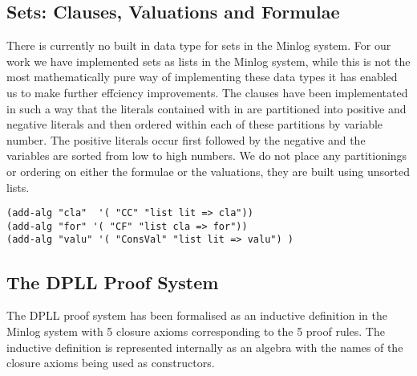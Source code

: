 \subsection*{Sets: Clauses, Valuations and Formulae}
There is currently no built in data type for sets in the Minlog system. For our work we have implemented sets as lists in the Minlog system, while this is not the most mathematically pure way of implementing these data types it has enabled us to make further effciency improvements. The clauses have been implementated in such a way that the literals contained with in are partitioned into positive and negative literals and then ordered within each of these partitions by variable number. The positive literals occur first followed by the negative and the variables are sorted from low to high numbers. We do not place any partitionings or ordering on either the formulae or the valuations, they are built using unsorted lists.

\begin{lstlisting}[caption = "Definitions of clauses \, formulae and valulations in the Minlog system"]
(add-alg "cla"  '( "CC" "list lit => cla"))
(add-alg "for" '( "CF" "list cla => for"))
(add-alg "valu" '( "ConsVal" "list lit => valu") )
\end{lstlisting}


\subsection*{The DPLL Proof System}
The DPLL proof system has been formalised as an inductive definition in the Minlog system with 5 closure axioms corresponding to the 5 proof rules. The inductive definition is represented internally as an algebra with the names of the closure axioms being used as constructors.

